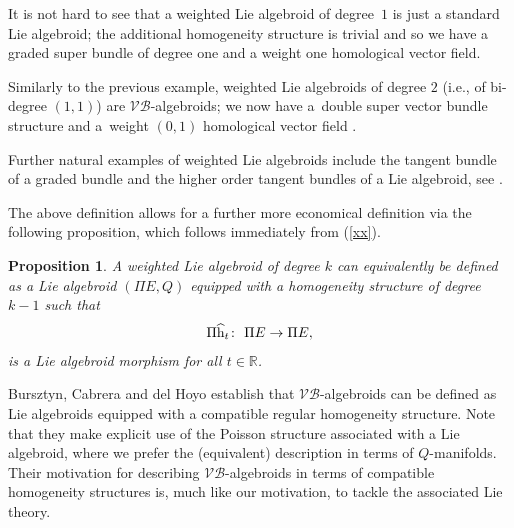 \documentclass[pdftex]{sigma}
\newcommand{\rmh}{\textnormal{h}}
\numberwithin{equation}{section}
\newtheorem{Proposition}[Theorem]{Proposition}
 { \theoremstyle{definition}
\newtheorem{Definition}[Theorem]{Definition}
\newtheorem{Example}[Theorem]{Example}
\newtheorem{Remark}[Theorem]{Remark} }
\begin{document}
 \begin{Example}It is not hard to see that a weighted Lie algebroid of degree~$1$ is just a standard Lie algebroid; the additional homogeneity structure is trivial and so we have a graded super bundle of degree one and a weight one homological vector f\/ield.
 \end{Example}

 \begin{Example}
 Similarly to the previous example, weighted Lie algebroids of degree $2$  (i.e., of bi-degree $(1,1)$) are $\mathcal{VB}$-algebroids; we now have a~double super vector bundle structure and a~weight $(0,1)$ homological vector f\/ield \cite{Gracia-Saz:2009}.
 \end{Example}
Further natural examples of weighted Lie algebroids include the tangent bundle of a graded bundle and the higher order tangent bundles of a Lie algebroid, see \cite{Bruce:2014}.

 The above def\/inition allows for a further more economical def\/inition via the following proposition, which follows immediately from (\ref{xx}).

\begin{Proposition}
A weighted Lie algebroid of degree $k$ can equivalently be defined as a Lie algebroid $(\Pi E, Q)$ equipped with a homogeneity structure of degree $k-1$ such that
\begin{gather*}
\Pi  \widehat{\rmh}_{t}\colon \  \Pi E \rightarrow \Pi E,
\end{gather*}
\noindent is a Lie algebroid morphism for all $t \in \mathbb{R}$.
\end{Proposition}

\begin{Remark}
Bursztyn, Cabrera and del Hoyo  \cite[Theorem~3.4.3]{Bursztyn:2014} establish  that $\mathcal{VB}$-algebroids can be def\/ined as Lie algebroids equipped with a compatible regular homogeneity structure. Note that they make explicit use of the Poisson structure associated with a Lie algebroid, where we prefer the (equivalent) description in terms of $Q$-manifolds.  Their motivation  for describing $\mathcal{VB}$-algebroids in terms of compatible homogeneity structures  is, much like our motivation,  to tackle the associated Lie theory.
\end{Remark}
\end{document}
